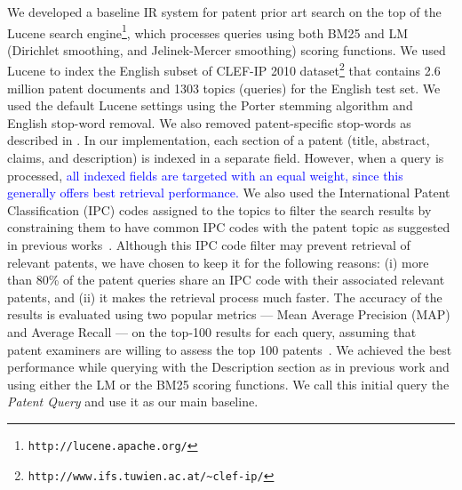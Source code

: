 We developed a baseline IR system for patent prior art search on the top of
the Lucene search engine\footnote{\texttt{http://lucene.apache.org/}}, which processes queries using both BM25
and LM (Dirichlet
smoothing, and Jelinek-Mercer smoothing)
scoring functions. %
We used Lucene to index the English subset of CLEF-IP 2010 dataset\footnote{\texttt{http://www.ifs.tuwien.ac.at/\textasciitilde{}clef-ip/}} 
that contains 2.6 million patent documents and 1303 topics (queries) for the English test set.
We used the default Lucene settings using the Porter stemming algorithm 
and English stop-word removal. 
We also removed patent-specific stop-words as described in \cite{magdy2012toward}.
In
our implementation, each section of a patent (title, abstract, claims,
and description) is indexed in a separate field. However, when a query 
is processed, \textcolor{blue}{all indexed fields are targeted with an equal weight, since this generally
offers best retrieval performance.}
We also used the International
Patent Classification (IPC) codes assigned to the topics to filter
the search results by constraining them to have common IPC codes with
the patent topic as suggested in previous works~\cite{lopez2010experiments}.
Although this IPC code filter may prevent retrieval of relevant patents, we
have chosen to keep it for the following reasons: (i) more than 80\%
of the patent queries share an IPC code with their associated relevant
patents, and (ii) it makes the retrieval process much faster. The accuracy of the results is evaluated using two popular metrics --- Mean Average Precision (MAP) and Average Recall --- on the top-100 results for each query, assuming that patent examiners are willing to assess the top 100 patents~\cite{joho2010survey}. 
We achieved the best performance while querying with the Description
section as in previous work \cite{xue2009transforming} and using
either the LM or the BM25 scoring functions. We call this initial
query the \textit{Patent Query} and use it as our main baseline.

